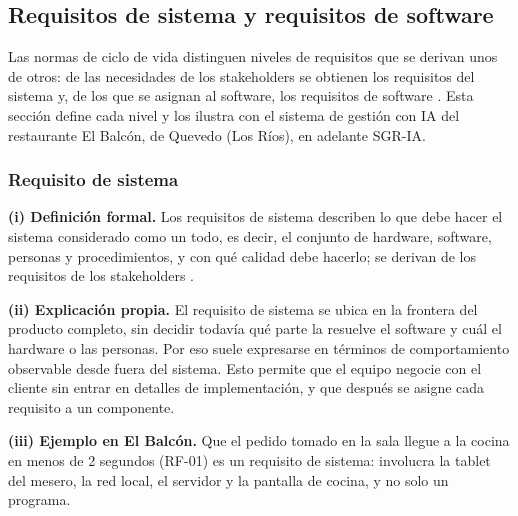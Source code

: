 \subsection{Requisitos de sistema y requisitos de software}
Las normas de ciclo de vida distinguen niveles de requisitos que se derivan unos de otros: de las necesidades de los stakeholders se obtienen los requisitos del sistema y, de los que se asignan al software, los requisitos de software \cite{ieee29148,iso15288,iso12207}. Esta secci\'on define cada nivel y los ilustra con el sistema de gesti\'on con IA del restaurante El Balc\'on, de Quevedo (Los R\'ios), en adelante SGR-IA.

\subsubsection{Requisito de sistema}
\textbf{(i) Definici\'on formal.} Los requisitos de sistema describen lo que debe hacer el sistema considerado como un todo, es decir, el conjunto de hardware, software, personas y procedimientos, y con qu\'e calidad debe hacerlo; se derivan de los requisitos de los stakeholders \cite{ieee29148,iso15288}.\par
\textbf{(ii) Explicaci\'on propia.} El requisito de sistema se ubica en la frontera del producto completo, sin decidir todav\'ia qu\'e parte la resuelve el software y cu\'al el hardware o las personas. Por eso suele expresarse en t\'erminos de comportamiento observable desde fuera del sistema. Esto permite que el equipo negocie con el cliente sin entrar en detalles de implementaci\'on, y que despu\'es se asigne cada requisito a un componente.\par
\textbf{(iii) Ejemplo en El Balc\'on.} Que el pedido tomado en la sala llegue a la cocina en menos de 2 segundos (RF-01) es un requisito de sistema: involucra la tablet del mesero, la red local, el servidor y la pantalla de cocina, y no solo un programa.\par

